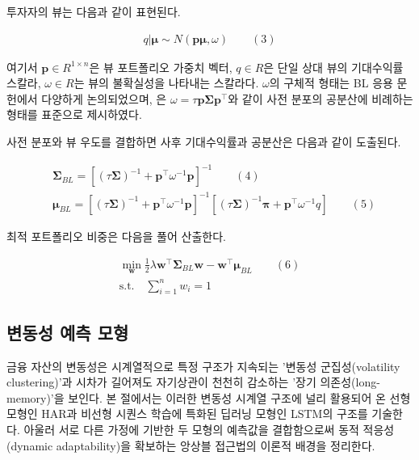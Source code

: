 \documentclass{article}
\begin{document}
투자자의 뷰는 다음과 같이 표현된다.

\begin{align}
    q|\boldsymbol{\mu} \sim N(\mathbf{p}\boldsymbol{\mu}, \omega) \qquad(3)\end{align}

여기서 $\mathbf{p} \in R^{1 \times n}$은 뷰 포트폴리오 가중치 벡터, $q \in R$은 단일 상대 뷰의 기대수익률 스칼라, $\omega\in R$는 뷰의 불확실성을 나타내는 스칼라다. $\omega$의 구체적 형태는 BL 응용 문헌에서 다양하게 논의되었으며, \citet{helitterman1999}은 $\omega = \tau\mathbf{p}\boldsymbol{\Sigma}\mathbf{p}^\top$와 같이 사전 분포의 공분산에 비례하는 형태를 표준으로 제시하였다.

사전 분포와 뷰 우도를 결합하면 사후 기대수익률과 공분산은 다음과 같이 도출된다.

\begin{align}
    & \boldsymbol{\Sigma}_{BL} = [(\tau\boldsymbol{\Sigma})^{-1} + \mathbf{p}^\top\omega^{-1}\mathbf{p}]^{-1} \qquad(4)\\
    
    & \boldsymbol{\mu}_{BL} = [(\tau\boldsymbol{\Sigma})^{-1} + \mathbf{p}^\top\omega^{-1}\mathbf{p}]^{-1}[(\tau\boldsymbol{\Sigma})^{-1}\boldsymbol{\pi}+\mathbf{p}^\top\omega^{-1}q] \qquad(5)\end{align}

최적 포트폴리오 비중은 다음을 풀어 산출한다.

\begin{align}
    \min_{\mathbf{w}}\frac{1}{2}\lambda\mathbf{w}^\top\boldsymbol{\Sigma}_{BL}\mathbf{w}-\mathbf{w}^\top\boldsymbol{\mu}_{BL} \qquad(6)\\
\text{s.t.} \quad \sum_{i=1}^{n}{w_i} = 1
\end{align}

\subsection{변동성 예측 모형}
\label{subsec:vol_pred_review}

금융 자산의 변동성은 시계열적으로 특정 구조가 지속되는 '변동성 군집성(volatility clustering)'과 시차가 길어져도 자기상관이 천천히 감소하는 '장기 의존성(long-memory)'을 보인다\citep{cont2001}. 본 절에서는 이러한 변동성 시계열 구조에 널리 활용되어 온 선형 모형인 HAR\citep{muller1997}과 비선형 시퀀스 학습에 특화된 딥러닝 모형인 LSTM\citep{hochreiter1997}의 구조를 기술한다. 아울러 서로 다른 가정에 기반한 두 모형의 예측값을 결합함으로써 동적 적응성(dynamic adaptability)을 확보하는 앙상블 접근법의 이론적 배경을 정리한다.
\end{document}
